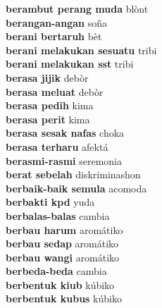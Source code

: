 \textbf{ berambut perang muda  } blònt \\
\textbf{ berangan-angan  } soña \\
\textbf{ berani bertaruh  } bèt \\
\textbf{ berani melakukan sesuatu  } tribi \\
\textbf{ berani melakukan sst  } tribi \\
\textbf{ berasa jijik  } debòr \\
\textbf{ berasa meluat  } debòr \\
\textbf{ berasa pedih  } kima \\
\textbf{ berasa perit  } kima \\
\textbf{ berasa sesak nafas  } choka \\
\textbf{ berasa terharu  } afektá \\
\textbf{ berasmi-rasmi  } seremonia \\
\textbf{ berat sebelah  } diskriminashon \\
\textbf{ berbaik-baik semula  } acomoda \\
\textbf{ berbakti kpd  } yuda \\
\textbf{ berbalas-balas  } cambia \\
\textbf{ berbau harum  } aromátiko \\
\textbf{ berbau sedap  } aromátiko \\
\textbf{ berbau wangi  } aromátiko \\
\textbf{ berbeda-beda  } cambia \\
\textbf{ berbentuk kiub  } kúbiko \\
\textbf{ berbentuk kubus  } kúbiko \\
